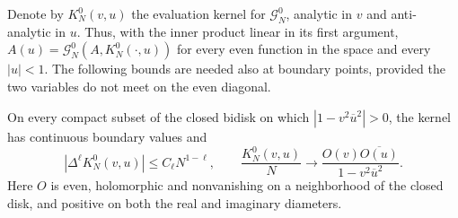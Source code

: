 Denote by $K_N^0(v,u)$ the evaluation kernel for
$\mathcal G_N^0$, analytic in $v$ and anti-analytic in $u$.
Thus, with the inner product linear in its first argument,
$A(u)=\mathcal G_N^0(A,K_N^0(\cdot,u))$ for every even function in the
space and every $|u|<1$. The following bounds are needed also at boundary
points, provided the two variables do not meet on the even diagonal.

\begin{lemma}\label{c:model-kernel}
On every compact subset of the closed bidisk on which
$|1-v^2\overline u^2|>0$, the kernel has continuous boundary values and
\[
 |\Delta^\ell K_N^0(v,u)|\le C_\ell N^{1-\ell},\qquad
 \frac{K_N^0(v,u)}N\longrightarrow
 \frac{O(v)\overline{O(u)}}{1-v^2\overline u^2}.
\]
Here $O$ is even, holomorphic and nonvanishing on a neighborhood of the
closed disk, and positive on both the real and imaginary diameters.
\end{lemma}

